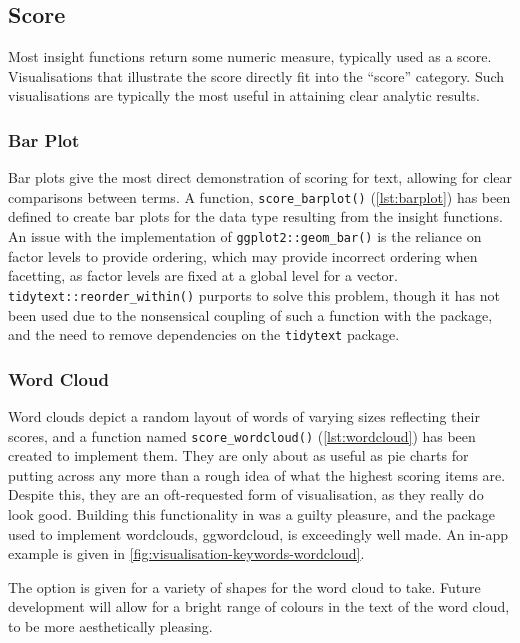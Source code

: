 \documentclass[11pt, a4paper, titlepage]{report}
\begin{document}
\subsection{Score}\label{sec:score}

Most insight functions return some numeric measure, typically used as
a score. Visualisations that illustrate the score directly fit into
the ``score'' category. Such visualisations are typically the most
useful in attaining clear analytic results.

\subsubsection{Bar Plot}\label{sec:bar-plot}

Bar plots give the most direct demonstration of scoring for text,
allowing for clear comparisons between terms. A function,
\texttt{score_barplot()} (\underline{\cref{lst:barplot}}) has
been defined to create bar plots for the data type resulting from the
insight functions. An issue with the implementation of
\texttt{ggplot2::geom_bar()} is the reliance on factor levels
to provide ordering, which may provide incorrect ordering when
facetting, as factor levels are fixed at a global level for a vector.
\texttt{tidytext::reorder_within()} purports to solve this
problem, though it has not been used due to the nonsensical coupling
of such a function with the package, and the need to remove
dependencies on the \texttt{tidytext} package.

\subsubsection{Word Cloud}\label{sec:word-cloud}

Word clouds depict a random layout of words of varying sizes
reflecting their scores, and a function named
\texttt{score_wordcloud()} (\underline{\cref{lst:wordcloud}})
has been created to implement them. They are only about as useful as
pie charts for putting across any more than a rough idea of what the
highest scoring items are. Despite this, they are an oft-requested
form of visualisation, as they really do look good. Building this
functionality in was a guilty pleasure, and the package used to
implement wordclouds, ggwordcloud, is exceedingly well
made\autocite{pennec19}. An in-app example is given in
\underline{\cref{fig:visualisation-keywords-wordcloud}}.

The option is given for a variety of shapes for the word cloud to
take. Future development will allow for a bright range of colours in
the text of the word cloud, to be more aesthetically pleasing.
\end{document}
